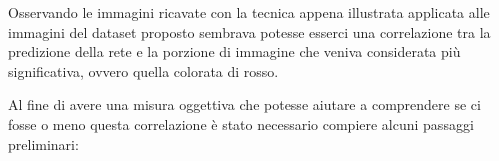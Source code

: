 Osservando le immagini ricavate con la tecnica appena illustrata applicata alle immagini del dataset proposto sembrava potesse esserci una correlazione tra la predizione della rete e la porzione di immagine che veniva considerata più significativa, ovvero quella colorata di rosso.

Al fine di avere una misura oggettiva che potesse aiutare a comprendere se ci fosse o meno questa correlazione è stato necessario compiere alcuni passaggi preliminari:

